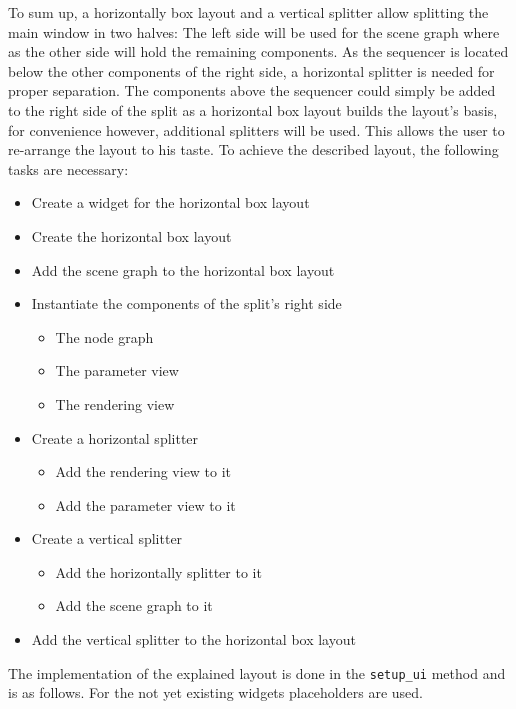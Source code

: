 \documentclass[10pt, openright, notitlepage]{scrreprt}
\begin{document}
To sum up, a horizontally box layout and a vertical splitter allow splitting the
main window in two halves: The left side will be used for the scene graph where
as the other side will hold the remaining components. As the sequencer is
located below the other components of the right side, a horizontal splitter is
needed for proper separation. The components above the sequencer could simply be
added to the right side of the split as a horizontal box layout builds the
layout's basis, for convenience however, additional splitters will be used. This
allows the user to re-arrange the layout to his taste. To achieve the described
layout, the following tasks are necessary:

\begin{itemize}
\item Create a widget for the horizontal box layout
\item Create the horizontal box layout
\item Add the scene graph to the horizontal box layout
\item Instantiate the components of the split's right side
\begin{itemize}
\item The node graph
\item The parameter view
\item The rendering view
\end{itemize}
\item Create a horizontal splitter
\begin{itemize}
\item Add the rendering view to it
\item Add the parameter view to it
\end{itemize}
\item Create a vertical splitter
\begin{itemize}
\item Add the horizontally splitter to it
\item Add the scene graph to it
\end{itemize}
\item Add the vertical splitter to the horizontal box layout
\end{itemize}

The implementation of the explained layout is done in the \texttt{setup\_ui} method and
is as follows. For the not yet existing widgets placeholders are used.
\end{document}
